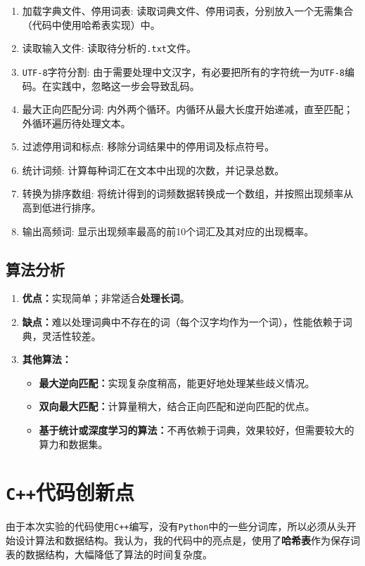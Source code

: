 \documentclass{article}
\begin{document}
\begin{enumerate}
	\item 加载字典文件、停用词表: 读取词典文件、停用词表，分别放入一个无需集合（代码中使用哈希表实现）中。
	\item 读取输入文件: 读取待分析的\texttt{.txt}文件。
	\item \texttt{UTF-8}字符分割: 由于需要处理中文汉字，有必要把所有的字符统一为\texttt{UTF-8}编码。在实践中，忽略这一步会导致乱码。
	\item 最大正向匹配分词: 内外两个循环。内循环从最大长度开始递减，直至匹配；外循环遍历待处理文本。
	\item 过滤停用词和标点: 移除分词结果中的停用词及标点符号。
	\item 统计词频: 计算每种词汇在文本中出现的次数，并记录总数。
	\item 转换为排序数组: 将统计得到的词频数据转换成一个数组，并按照出现频率从高到低进行排序。
	\item 输出高频词: 显示出现频率最高的前10个词汇及其对应的出现概率。
\end{enumerate}

\subsection{算法分析}

\begin{enumerate}
	\item \textbf{优点：}实现简单；非常适合\textbf{处理长词}。
	\item \textbf{缺点：}难以处理词典中不存在的词（每个汉字均作为一个词），性能依赖于词典，灵活性较差。
	\item \textbf{其他算法：}
	
	\begin{itemize}
		\item \textbf{最大逆向匹配：}实现复杂度稍高，能更好地处理某些歧义情况。
		\item \textbf{双向最大匹配：}计算量稍大，结合正向匹配和逆向匹配的优点。
		\item \textbf{基于统计或深度学习的算法：}不再依赖于词典，效果较好，但需要较大的算力和数据集。
	\end{itemize}
\end{enumerate}

\section{\texttt{C++}代码创新点}

由于本次实验的代码使用\texttt{C++}编写，没有\texttt{Python}中的一些分词库，所以必须从头开始设计算法和数据结构。我认为，我的代码中的亮点是，使用了\textbf{哈希表}作为保存词表的数据结构，大幅降低了算法的时间复杂度。
\end{document}

